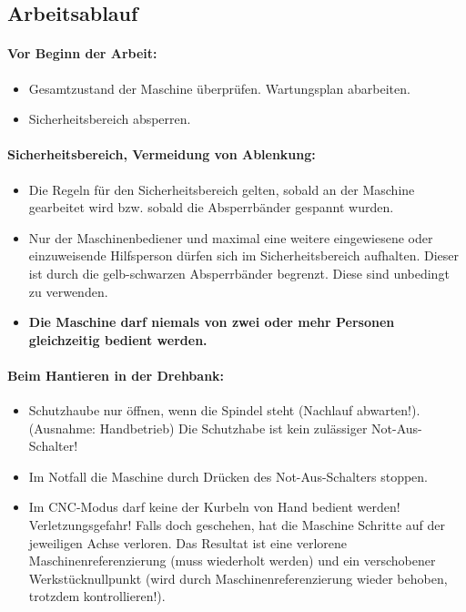 \documentclass{\basedir/fablab-document}
\begin{document}
\subsection{Arbeitsablauf}
\paragraph{Vor Beginn der Arbeit:}
\begin{itemize}
\item Gesamtzustand der Maschine überprüfen. Wartungsplan abarbeiten.
\item Sicherheitsbereich absperren.
\end{itemize}

\paragraph{Sicherheitsbereich, Vermeidung von Ablenkung:}
\begin{itemize}
\item Die Regeln für den Sicherheitsbereich gelten, sobald an der Maschine gearbeitet wird bzw. sobald die Absperrbänder gespannt wurden.
\item Nur der Maschinenbediener und maximal eine weitere eingewiesene oder einzuweisende Hilfsperson dürfen sich im Sicherheitsbereich aufhalten. Dieser ist durch die gelb-schwarzen Absperrbänder begrenzt. Diese sind unbedingt zu verwenden.
\item \textbf{Die Maschine darf niemals von zwei oder mehr Personen gleichzeitig bedient werden.}
\end{itemize}

\paragraph{Beim Hantieren in der Drehbank:}
\begin{itemize}
 \item Schutzhaube nur öffnen, wenn die Spindel steht (Nachlauf abwarten!). (Ausnahme: Handbetrieb) Die Schutzhabe ist kein zulässiger Not-Aus-Schalter!
\item Im Notfall die Maschine durch Drücken des Not-Aus-Schalters stoppen.
\item Im CNC-Modus darf keine der Kurbeln von Hand bedient werden! Verletzungsgefahr! Falls doch geschehen, hat die Maschine Schritte auf der jeweiligen Achse verloren. Das Resultat ist eine verlorene Maschinenreferenzierung (muss wiederholt werden) und ein verschobener Werkstücknullpunkt (wird durch Maschinenreferenzierung wieder behoben, trotzdem kontrollieren!).
\end{itemize}
\end{document}
